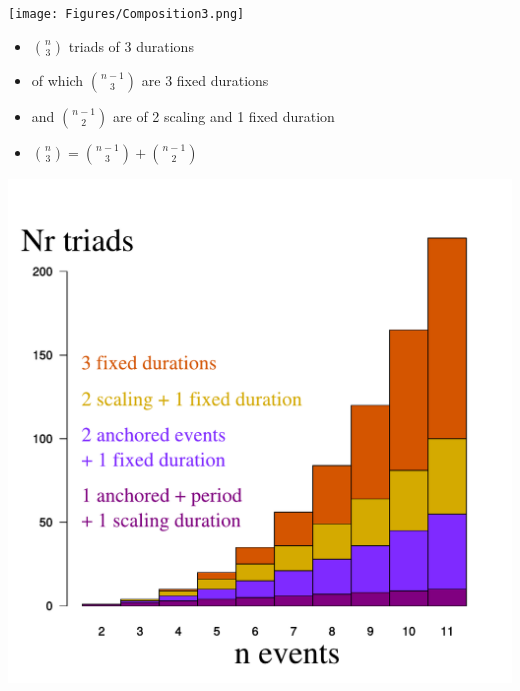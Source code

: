 \documentclass[20pt]{beamer}
\begin{document}
\begin{frame}[plain]
\Large

\begin{center}
\texttt{[image: Figures/Composition3.png]}
\end{center}
\begin{itemize}[<+->]
  \item $\binom{n}{3}$ triads of 3 durations
  \item of which $\binom{n-1}{3}$ are 3 fixed
  durations
  \item and $\binom{n-1}{2}$ are of 2 scaling and 1 fixed duration
  \item $\binom{n}{3} = \binom{n-1}{3} + \binom{n-1}{2}$
\end{itemize}
\end{frame}


\begin{frame}[plain]

\begin{center}
\includegraphics[scale=1]{Figures/id3compmarked.pdf}
\end{center}

\end{frame}
\end{document}
